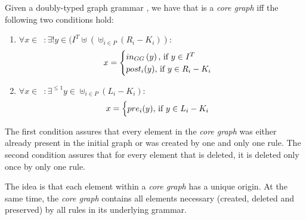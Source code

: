 \begin{definition}\label{def:core-graph} Given a doubly-typed graph grammar \doublyTypedGraphGrammarCore{}, we have that \coreGraph{} is a \emph{core graph} iff the following two conditions hold:

\begin{enumerate}

\item \mbox{$\forall x \in$ \coreGraph $: \exists! y \in (I^T \uplus (\uplus_{i \in P} (R_i - K_i))$}:
\[ x =
    \begin{cases}
      in_{GG}\parens{y},$ if $y \in I^T\\
      post_i(y),$ if $y \in R_i - K_i\\
    \end{cases}
   \]

\item \mbox{$\forall x \in$ \coreGraph $: \exists^{\leq1} y \in \uplus_{i \in P} (L_i - K_i)$}:
\[ x =
    \begin{cases}
      pre_i(y),$ if $y \in L_i - K_i\\
    \end{cases}
   \]\end{enumerate}

  The first condition assures that every element in the \emph{core graph} was either already present in the initial graph or was created by one and only one rule. The second condition assures that for every element that is deleted, it is deleted only once by only one rule. 
\end{definition}

The idea is that each element within a \emph{core graph} has a unique origin. At the same time, the \emph{core graph} contains all elements necessary (created, deleted and preserved) by all rules in its underlying grammar.


